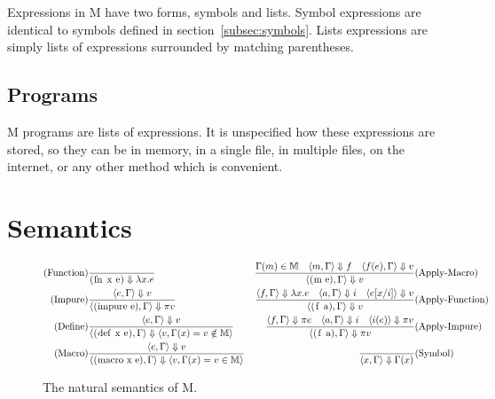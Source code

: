 \documentclass{article}
\begin{document}
\begin{multicols}{2}
        Expressions in M have two forms, symbols and lists.
        Symbol expressions are identical to symbols defined in section~\ref{subsec:symbols}.
        Lists expressions are simply lists of expressions surrounded by matching parentheses.

        \subsection{Programs}\label{subsec:programs}

        M programs are lists of expressions.
        It is unspecified how these expressions are stored, so they can be in memory, in a single file, in multiple files, on the internet, or any other method which is convenient.
    \end{multicols}
    \newpage

    \section{Semantics}\label{sec:semantics}

    \begin{figure}[h]
        \centering
        \begin{align*}
            \text{(Function)}&\dfrac{}{\lstinline$(fn x e)$\Downarrow\lambda x.e}
            &\dfrac{\Gamma(m)\in\mathbb{M}\quad\langle m,\Gamma\rangle\Downarrow f\quad\langle f(e),\Gamma\rangle\Downarrow v}{\langle\lstinline$(m e)$,\Gamma\rangle\Downarrow v}&\text{(Apply-Macro)}\\
            \text{(Impure)}&\dfrac{\langle e,\Gamma\rangle\Downarrow v}{\langle\lstinline$(impure e)$,\Gamma\rangle\Downarrow\pi v}
            &\dfrac{\langle f,\Gamma\rangle\Downarrow\lambda x.e\quad\langle a,\Gamma\rangle\Downarrow i\quad\langle e[x/i]\rangle\Downarrow v}{\langle\lstinline$(f a)$,\Gamma\rangle\Downarrow v}&\text{(Apply-Function)}\\
            \text{(Define)}&\dfrac{\langle e,\Gamma\rangle\Downarrow v}{\langle\lstinline$(def x e)$,\Gamma\rangle\Downarrow\langle v,\Gamma(x) = v\notin\mathbb{M}\rangle}
            &\dfrac{\langle f,\Gamma\rangle\Downarrow\pi e\quad\langle a,\Gamma\rangle\Downarrow i\quad\langle i(e)\rangle\Downarrow\pi v}{\langle\lstinline$(f a)$,\Gamma\rangle\Downarrow\pi v}&\text{(Apply-Impure)}\\
            \text{(Macro)}&\dfrac{\langle e,\Gamma\rangle\Downarrow v}{\langle\lstinline$(macro x e)$,\Gamma\rangle\Downarrow\langle v,\Gamma(x) = v\in\mathbb{M}\rangle}
            &\dfrac{}{\langle x,\Gamma\rangle\Downarrow\Gamma(x)}&\text{(Symbol)}
        \end{align*}
        \caption{The natural semantics of M.}
    \end{figure}
\end{document}
